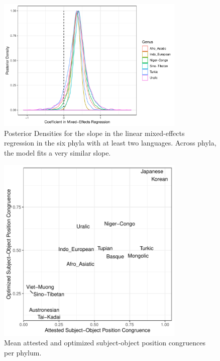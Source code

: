 \documentclass[11pt,a4paper]{article}
\begin{document}
\begin{figure}
    \centering
            \includegraphics[width=0.8\textwidth]{../analysis/figures-scratch/per-phylum-posteriors.pdf}
     \caption{Posterior Densities for the slope in the linear mixed-effects regression in the six phyla with at least two languages. Across phyla, the model fits a very similar slope.}
    \label{fig:my_label}
\end{figure}

 \begin{figure}
    \centering
                 \includegraphics[width=0.8\textwidth]{../analysis/figures-scratch/per-phylum-means.pdf}
    \caption{Mean attested and optimized subject-object position congruences per phylum.}
    \label{fig:my_label}
\end{figure}
\end{document}
